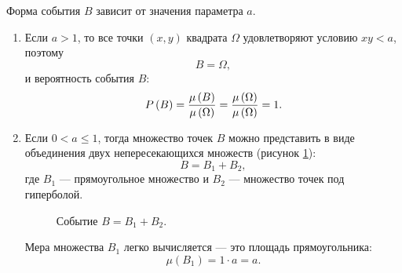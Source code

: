 Форма события $B$ зависит от значения параметра $a$.
\begin{enumerate}
    \item
    Если $a > 1$, то все точки $(x,y)$ квадрата $\Omega$ удовлетворяют условию $x y < a$, поэтому
    \begin{equation}
        B = \Omega,
    \end{equation}
    и вероятность события $B$:
    \begin{equation}
        P \left ( B \right )
        = \frac{\mu \left ( B \right )}{\mu \left ( \Omega \right )}
        = \frac{\mu \left ( \Omega \right )}{\mu \left ( \Omega \right )}
        = 1 .
    \end{equation}

    \item
    Если $0 < a \le 1$, тогда множество точек $B$ можно представить в виде объединения двух непересекающихся множеств (рисунок \ref{figure:lesson_3:40:B}):
    \begin{equation}
        B = B_1 + B_2 ,
    \end{equation}
    где $B_1$ --- прямоугольное множество и $B_2$ --- множество точек под гиперболой.

    \begin{figure}[h]
        \centering
        \caption{Событие $B = B_1 + B_2$.}
        \label{figure:lesson_3:40:B}
    \end{figure}

    Мера множества $B_1$ легко вычисляется --- это площадь прямоугольника:
    \begin{equation}
        \mu \left ( B_1 \right )
        = 1 \cdot a
        = a .
    \end{equation}


\end{enumerate}
